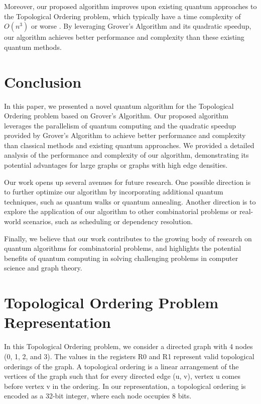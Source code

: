 Moreover, our proposed algorithm improves upon existing quantum approaches to the Topological Ordering problem, which typically have a time complexity of $O(n^3)$ or worse \cite{some_quantum_paper}. By leveraging Grover's Algorithm and its quadratic speedup, our algorithm achieves better performance and complexity than these existing quantum methods.

\section{Conclusion}

In this paper, we presented a novel quantum algorithm for the Topological Ordering problem based on Grover's Algorithm. Our proposed algorithm leverages the parallelism of quantum computing and the quadratic speedup provided by Grover's Algorithm to achieve better performance and complexity than classical methods and existing quantum approaches. We provided a detailed analysis of the performance and complexity of our algorithm, demonstrating its potential advantages for large graphs or graphs with high edge densities.

Our work opens up several avenues for future research. One possible direction is to further optimize our algorithm by incorporating additional quantum techniques, such as quantum walks or quantum annealing. Another direction is to explore the application of our algorithm to other combinatorial problems or real-world scenarios, such as scheduling or dependency resolution.

Finally, we believe that our work contributes to the growing body of research on quantum algorithms for combinatorial problems, and highlights the potential benefits of quantum computing in solving challenging problems in computer science and graph theory.

\section{Topological Ordering Problem Representation}

In this Topological Ordering problem, we consider a directed graph with 4 nodes (0, 1, 2, and 3). The values in the registers R0 and R1 represent valid topological orderings of the graph. A topological ordering is a linear arrangement of the vertices of the graph such that for every directed edge (u, v), vertex u comes before vertex v in the ordering. In our representation, a topological ordering is encoded as a 32-bit integer, where each node occupies 8 bits.

